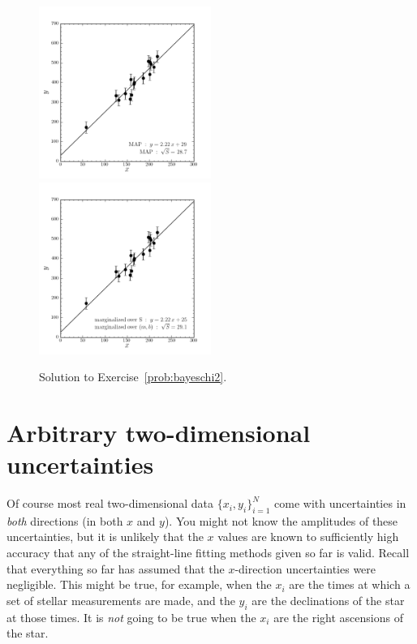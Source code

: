 \documentclass[12pt,twoside]{article}
\newcommand{\problemname}{Exercise}
\newcounter{problem}
\newcommand{\setofall}[3]{\{{#1}\}_{{#2}}^{{#3}}}
\newcommand{\allxy}{\setofall{x_i,y_i}{i=1}{N}}
\begin{document}
\begin{figure}[htbp]
\includegraphics[width=0.5\textwidth]{ex10a.png}
\includegraphics[width=0.5\textwidth]{ex10b.png}
\caption{Solution to \problemname~\ref{prob:bayeschi2}.}\label{fig:bayeschi2}
\end{figure}

\section{Arbitrary two-dimensional uncertainties}\label{sec:twod}

Of course most real two-dimensional data $\allxy$ come with
uncertainties in \emph{both} directions (in both $x$ and $y$).  You
might not know the amplitudes of these uncertainties, but it is
unlikely that the $x$ values are known to sufficiently high accuracy
that any of the straight-line fitting methods given so far is valid.
Recall that everything so far has assumed that the $x$-direction
uncertainties were negligible.  This might be true, for example, when
the $x_i$ are the times at which a set of stellar measurements are
made, and the $y_i$ are the declinations of the star at those times.
It is \emph{not} going to be true when the $x_i$ are the right
ascensions of the star.
\end{document}
